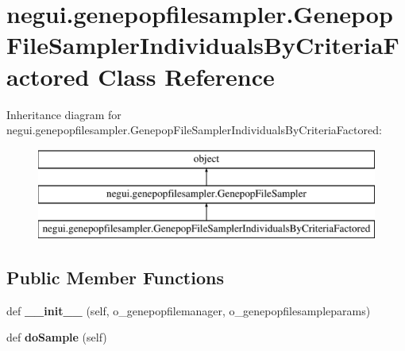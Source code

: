 \hypertarget{classnegui_1_1genepopfilesampler_1_1GenepopFileSamplerIndividualsByCriteriaFactored}{}\section{negui.\+genepopfilesampler.\+Genepop\+File\+Sampler\+Individuals\+By\+Criteria\+Factored Class Reference}
\label{classnegui_1_1genepopfilesampler_1_1GenepopFileSamplerIndividualsByCriteriaFactored}
Inheritance diagram for negui.\+genepopfilesampler.\+Genepop\+File\+Sampler\+Individuals\+By\+Criteria\+Factored\+:\begin{figure}[H]
\begin{center}
\leavevmode
\includegraphics[height=3.000000cm]{classnegui_1_1genepopfilesampler_1_1GenepopFileSamplerIndividualsByCriteriaFactored}
\end{center}
\end{figure}
\subsection*{Public Member Functions}
\begin{DoxyCompactItemize}
\item 
def {\bfseries \+\_\+\+\_\+init\+\_\+\+\_\+} (self, o\+\_\+genepopfilemanager, o\+\_\+genepopfilesampleparams)\hypertarget{classnegui_1_1genepopfilesampler_1_1GenepopFileSamplerIndividualsByCriteriaFactored_a8c5aa4e8af5d35a2ab9983a8e64cec0e}{}\label{classnegui_1_1genepopfilesampler_1_1GenepopFileSamplerIndividualsByCriteriaFactored_a8c5aa4e8af5d35a2ab9983a8e64cec0e}

\item 
def {\bfseries do\+Sample} (self)\hypertarget{classnegui_1_1genepopfilesampler_1_1GenepopFileSamplerIndividualsByCriteriaFactored_afb4984d0dc7060e94765116320987b4d}{}\label{classnegui_1_1genepopfilesampler_1_1GenepopFileSamplerIndividualsByCriteriaFactored_afb4984d0dc7060e94765116320987b4d}

\end{DoxyCompactItemize}


